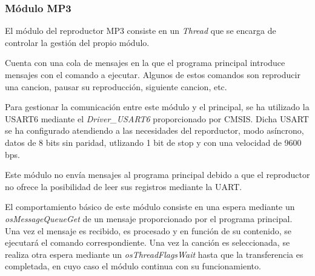 \subsubsection{Módulo MP3}
El módulo del reproductor MP3 consiste en un \textit{Thread} que se encarga de controlar la gestión del propio módulo.

Cuenta con una cola de mensajes en la que el programa principal introduce mensajes con el comando a ejecutar. Algunos de estos comandos son reproducir una cancion, pausar su reproducción, siguiente cancion, etc.

Para gestionar la comunicación entre este módulo y el principal, se ha utilizado la USART6 mediante el \textit{Driver\_USART6} proporcionado por CMSIS. Dicha USART se ha configurado atendiendo a las necesidades del reporductor, modo asíncrono, datos de 8 bits sin paridad, utlizando 1 bit de stop y con una velocidad de 9600 bps.

Este módulo no envía mensajes al programa principal debido a que el reproductor no ofrece la posibilidad de leer sus registros mediante la UART.

El comportamiento básico de este módulo consiste en una espera mediante un \textit{osMessageQueueGet} de un mensaje proporcionado por el programa principal. Una vez el mensaje es recibido, es procesado y en función de su contenido, se ejecutará el comando correspondiente. Una vez la canción es seleccionada, se realiza otra espera mediante un \textit{osThreadFlagsWait} hasta que la transferencia es completada, en cuyo caso el módulo continua con su funcionamiento.
